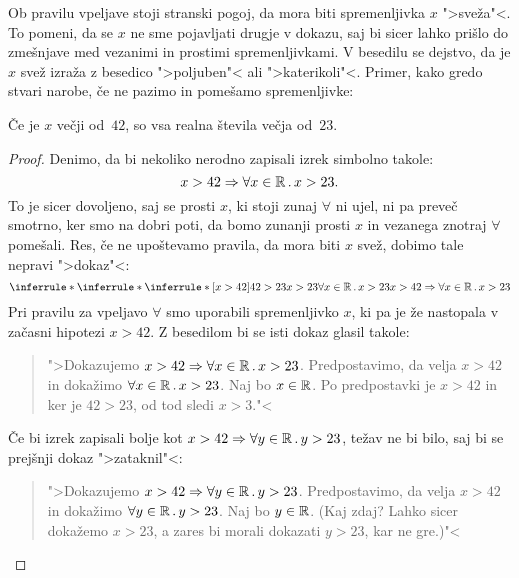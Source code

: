 Ob pravilu vpeljave stoji stranski pogoj, da mora biti spremenljivka
$x$ ">sveža"<. To pomeni, da se $x$ ne sme pojavljati drugje v dokazu,
saj bi sicer lahko prišlo do zmešnjave med vezanimi in prostimi
spremenljivkami. V besedilu se dejstvo, da je $x$ svež izraža z
besedico ">poljuben"< ali ">katerikoli"<. Primer, kako gredo stvari
narobe, če ne pazimo in pomešamo spremenljivke:

\begin{izrek}
  Če je $x$ večji od~$42$, so vsa realna števila večja od~$23$.
\end{izrek}

\begin{proof}
  Denimo, da bi nekoliko nerodno zapisali izrek simbolno takole:
  \begin{equation*}
    x > 42 \Rightarrow \forall x \in \mathbb{R} \,.\, x > 23.
  \end{equation*}
  To je sicer dovoljeno, saj se prosti $x$, ki stoji zunaj $\forall$
  ni ujel, ni pa preveč smotrno, ker smo na dobri poti, da bomo
  zunanji prosti $x$ in vezanega znotraj $\forall$ pomešali. Res, če
  ne upoštevamo pravila, da mora biti $x$ svež, dobimo tale nepravi
  ">dokaz"<:
  \begin{equation*}
    \inferrule*
    {
      \inferrule*
      {\inferrule*
        {[x > 42] \\ 42 > 23}
        {x > 23}
      }
      {\all{x \in \RR} x > 23}
    }
    {x > 42 \lthen \all{x \in \RR} x > 23}
  \end{equation*}
  Pri pravilu za vpeljavo $\forall$ smo uporabili spremenljivko $x$,
  ki pa je že nastopala v začasni hipotezi $x > 42$. Z besedilom bi se
  isti dokaz glasil takole:
  \begin{quote}
    ">Dokazujemo $x > 42 \Rightarrow \forall x \in \mathbb{R} \,.\, x > 23$. Predpostavimo,
    da velja $x > 42$ in dokažimo $\forall x \in \mathbb{R} \,.\, x > 23$. Naj bo $x
    \in \mathbb{R}$. Po predpostavki je $x > 42$ in ker je $42 > 23$, od tod
    sledi $x > 3$."<
  \end{quote}
  Če bi izrek zapisali bolje kot $x > 42 \Rightarrow \forall y \in \mathbb{R} \,.\, y >
    23$, težav ne bi bilo, saj bi se prejšnji dokaz ">zataknil"<:
  \begin{quote}
    ">Dokazujemo $x > 42 \Rightarrow \forall y \in \mathbb{R} \,.\, y > 23$. Predpostavimo,
    da velja $x > 42$ in dokažimo $\forall y \in \mathbb{R} \,.\, y > 23$. Naj bo $y
    \in \mathbb{R}$. (Kaj zdaj? Lahko sicer dokažemo $x > 23$, a zares bi
    morali dokazati $y > 23$, kar ne gre.)"<
  \end{quote}
\end{proof}

